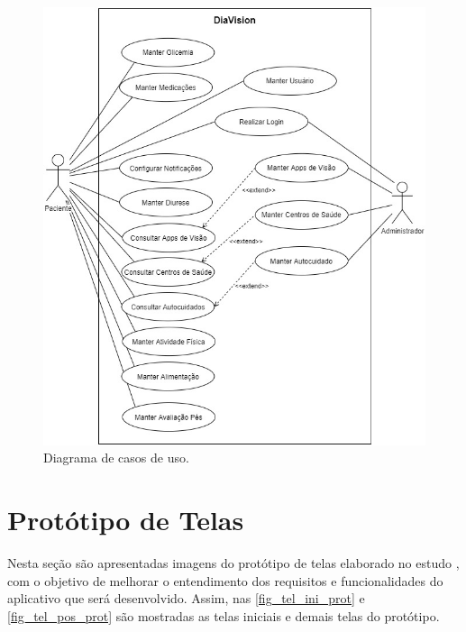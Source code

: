\begin{figure}[htb]
    \caption{\label{fig_use_cas}Diagrama de casos de uso.}
    \begin{center}
        \includegraphics[scale=0.65]{Imagens/proposta/use_case.jpg}
    \end{center}
\end{figure}

\newpage

\section{Protótipo de Telas}

Nesta seção são apresentadas imagens do protótipo de telas elaborado no estudo , com o objetivo de melhorar o entendimento dos
requisitos e funcionalidades do aplicativo que será desenvolvido.
Assim, nas \autoref{fig_tel_ini_prot} e \autoref{fig_tel_pos_prot} são mostradas as telas iniciais e demais telas do protótipo.

